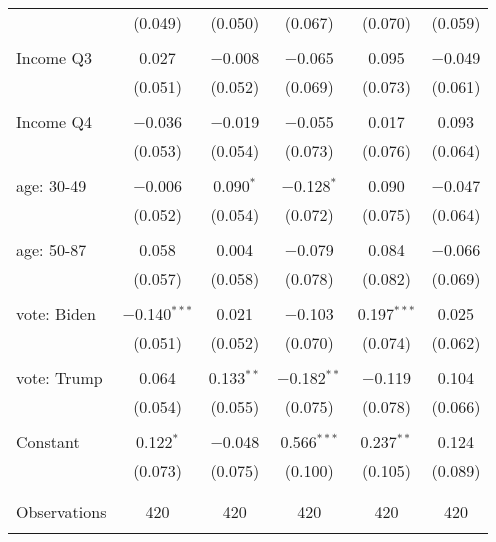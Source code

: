 \begin{tabular}{@{\extracolsep{5pt}}lccccc}
  & (0.049) & (0.050) & (0.067) & (0.070) & (0.059) \\ 
  & & & & & \\ 
 Income Q3 & 0.027 & $-$0.008 & $-$0.065 & 0.095 & $-$0.049 \\ 
  & (0.051) & (0.052) & (0.069) & (0.073) & (0.061) \\ 
  & & & & & \\ 
 Income Q4 & $-$0.036 & $-$0.019 & $-$0.055 & 0.017 & 0.093 \\ 
  & (0.053) & (0.054) & (0.073) & (0.076) & (0.064) \\ 
  & & & & & \\ 
 age: 30-49 & $-$0.006 & 0.090$^{*}$ & $-$0.128$^{*}$ & 0.090 & $-$0.047 \\ 
  & (0.052) & (0.054) & (0.072) & (0.075) & (0.064) \\ 
  & & & & & \\ 
 age: 50-87 & 0.058 & 0.004 & $-$0.079 & 0.084 & $-$0.066 \\ 
  & (0.057) & (0.058) & (0.078) & (0.082) & (0.069) \\ 
  & & & & & \\ 
 vote: Biden & $-$0.140$^{***}$ & 0.021 & $-$0.103 & 0.197$^{***}$ & 0.025 \\ 
  & (0.051) & (0.052) & (0.070) & (0.074) & (0.062) \\ 
  & & & & & \\ 
 vote: Trump & 0.064 & 0.133$^{**}$ & $-$0.182$^{**}$ & $-$0.119 & 0.104 \\ 
  & (0.054) & (0.055) & (0.075) & (0.078) & (0.066) \\ 
  & & & & & \\ 
 Constant & 0.122$^{*}$ & $-$0.048 & 0.566$^{***}$ & 0.237$^{**}$ & 0.124 \\ 
  & (0.073) & (0.075) & (0.100) & (0.105) & (0.089) \\ 
  & & & & & \\ 
\hline \\[-1.8ex] 

Observations & 420 & 420 & 420 & 420 & 420 \\ 
\hline 
\hline \\[-1.8ex] 
\end{tabular} 